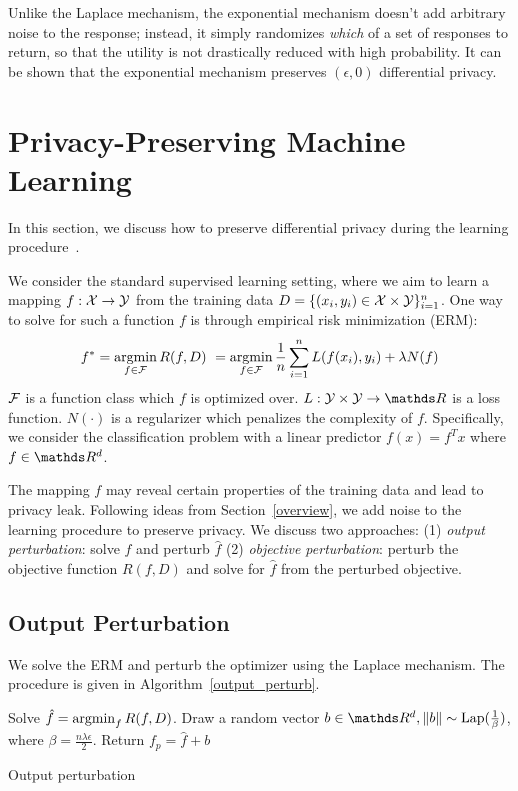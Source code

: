 \documentclass{article} %
\begin{document}
Unlike the Laplace mechanism, the exponential mechanism doesn't add arbitrary
noise to the response; instead, it simply randomizes \textit{which} of a set of
responses to return, so that the utility is not drastically reduced with high
probability. It can be shown that the exponential mechanism preserves
$(\epsilon, 0)$ differential privacy.

\section{Privacy-Preserving Machine Learning}
In this section, we discuss how to preserve differential privacy during the learning procedure~\cite{chaudhuri2011erm}.

We consider the standard supervised learning setting, where we aim to learn a mapping $f: \mathcal{X} \rightarrow \mathcal{Y}$ from the training data $D = \{(x_i, y_i) \in \mathcal{X} \times \mathcal{Y}\}_{i=1}^n$. One way to solve for such a function $f$ is through empirical risk minimization (ERM):
$$f^* = \operatorname*{argmin}_{f\in \mathcal{F}} R(f, D) \ =\operatorname*{argmin}_{f\in \mathcal{F}} \frac{1}{n}\sum_{i=1}^n L(f(x_i), y_i) + \lambda N(f)$$
$\mathcal{F}$ is a function class which $f$ is optimized over. $L:\Y \times \Y \rightarrow \R$ is a loss function. $N(\cdot)$ is a regularizer which penalizes the complexity of $f$. Specifically, we consider the classification problem with a linear predictor $f(x) = f^T x$ where $f\in \R^d$.

The mapping $f$ may reveal certain properties of the training data and lead to privacy leak. Following ideas from Section~\ref{overview}, we add noise to the learning procedure to preserve privacy. We discuss two approaches: (1) \emph{output perturbation}: solve $\hat{f}$ and perturb $\hat{f}$ (2) \emph{objective perturbation}: perturb the objective function $R(f, D)$ and solve for $\hat{f}$ from the perturbed objective.

\subsection{Output Perturbation}
We solve the ERM and perturb the optimizer using the Laplace mechanism. The procedure is given in Algorithm~\ref{output_perturb}.

\begin{algorithm}[htb]
\begin{algorithmic}[1]
	\State Solve $\hat{f} = \operatorname*{argmin}_f R(f, D)$.
	\State Draw a random vector $b\in \R^d, \norm{b}\sim \text{Lap}(\frac{1}{\beta})$, where $\beta = \frac{n\lambda \epsilon}{2}$.
    \State Return $f_{p} = \hat{f} + b$
   \EndFunction
\end{algorithmic}
\caption{Output perturbation}\label{alg:output_perturb}
\end{algorithm}
\end{document}
